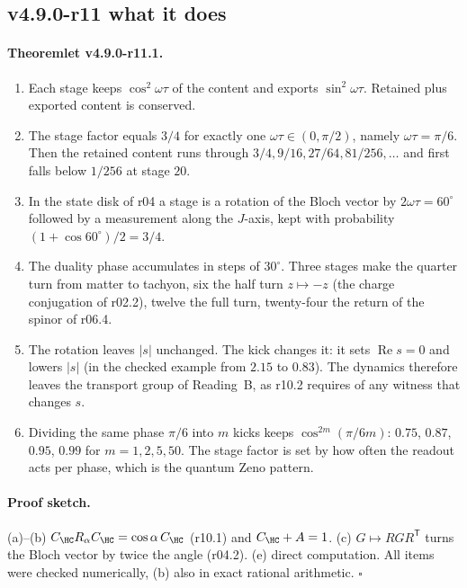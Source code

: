\subsection*{v4.9.0-r11 what it does}
\label{subsec:v490-r11-properties}

\paragraph{Theoremlet v4.9.0-r11.1.}
\begin{enumerate}[leftmargin=2em]
\item[(a)] Each stage keeps \(\cos^2\omega\tau\) of the content and exports \(\sin^2\omega\tau\).  Retained plus exported
content is conserved.
\item[(b)] The stage factor equals \(3/4\) for exactly one \(\omega\tau\in(0,\pi/2)\), namely \(\omega\tau=\pi/6\).  Then the
retained content runs through \(3/4,9/16,27/64,81/256,\ldots\) and first falls below \(1/256\) at stage \(20\).
\item[(c)] In the state disk of r04 a stage is a rotation of the Bloch vector by \(2\omega\tau=60^\circ\) followed by a
measurement along the \(J\)-axis, kept with probability \((1+\cos60^\circ)/2=3/4\).
\item[(d)] The duality phase accumulates in steps of \(30^\circ\).  Three stages make the quarter turn from matter to
tachyon, six the half turn \(z\mapsto-z\) (the charge conjugation of r02.2), twelve the full turn, twenty-four the return of
the spinor of r06.4.
\item[(e)] The rotation leaves \(|s|\) unchanged.  The kick changes it: it sets \(\operatorname{Re}s=0\) and lowers
\(|s|\) (in the checked example from \(2.15\) to \(0.83\)).  The dynamics therefore leaves the transport group of
Reading~B, as r10.2 requires of any witness that changes \(s\).
\item[(f)] Dividing the same phase \(\pi/6\) into \(m\) kicks keeps \(\cos^{2m}(\pi/6m)\): \(0.75\), \(0.87\), \(0.95\), \(0.99\)
for \(m=1,2,5,50\).  The stage factor is set by how often the readout acts per phase, which is the quantum Zeno pattern.
\end{enumerate}

\paragraph{Proof sketch.}
(a)--(b) \(C_{\HC}R_\alpha C_{\HC}=\cos\alpha\,C_{\HC}\) (r10.1) and \(C_{\HC}+A=1\).  (c) \(G\mapsto RGR^{\mathsf T}\) turns the
Bloch vector by twice the angle (r04.2).  (e) direct computation.  All items were checked numerically, (b) also in exact
rational arithmetic.  \(\square\)

